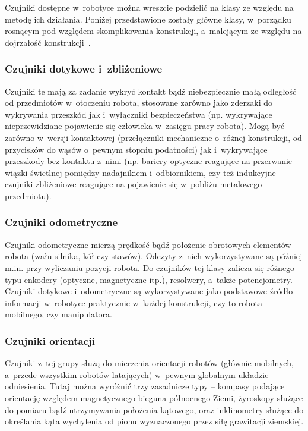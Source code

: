 Czujniki dostępne w~robotyce można wreszcie podzielić na klasy ze względu
na metodę ich działania. Poniżej przedstawione zostały główne klasy, w~porządku
rosnącym pod względem skomplikowania konstrukcji, a~malejącym ze względu na
dojrzałość konstrukcji~\cite{siegwart}.

\subsubsection{Czujniki dotykowe i~zbliżeniowe}

Czujniki te mają za zadanie wykryć kontakt bądź niebezpiecznie małą odległość
od przedmiotów w~otoczeniu robota, stosowane zarówno jako zderzaki do wykrywania
przeszkód jak i~wyłączniki bezpieczeństwa (np. wykrywające nieprzewidziane
pojawienie się człowieka w~zasięgu pracy robota). Mogą być zarówno w~wersji
kontaktowej (przełączniki mechaniczne o~różnej konstrukcji, od przycisków
do wąsów o~pewnym stopniu podatności) jak i~wykrywające przeszkody bez
kontaktu z~nimi (np. bariery optyczne reagujące na przerwanie wiązki świetlnej
pomiędzy nadajnikiem i~odbiornikiem, czy też indukcyjne czujniki zbliżeniowe
reagujące na pojawienie się w~pobliżu metalowego przedmiotu).

\subsubsection{Czujniki odometryczne}

Czujniki odometryczne mierzą prędkość bądź położenie obrotowych elementów
robota (wału silnika, kół czy stawów). Odczyty z~nich wykorzystywane są
później m.in. przy wyliczaniu pozycji robota. Do czujników tej klasy zalicza się
różnego typu enkodery (optyczne, magnetyczne itp.), resolwery, a~także potencjometry.
Czujniki dotykowe i~odometryczne są wykorzystywane jako podstawowe źródło
informacji w~robotyce praktycznie w~każdej konstrukcji, czy to robota mobilnego,
czy manipulatora.

\subsubsection{Czujniki orientacji}

Czujniki z~tej grupy służą do mierzenia orientacji robotów (głównie mobilnych,
a~przede wszystkim robotów latających) w~pewnym globalnym układzie odniesienia.
Tutaj można wyróżnić trzy zasadnicze typy -- kompasy podające orientację
względem magnetycznego bieguna północnego Ziemi, żyroskopy służące do pomiaru
bądź utrzymywania położenia kątowego, oraz inklinometry służące do określania
kąta wychylenia od pionu wyznaczonego przez siłę grawitacji ziemskiej.

